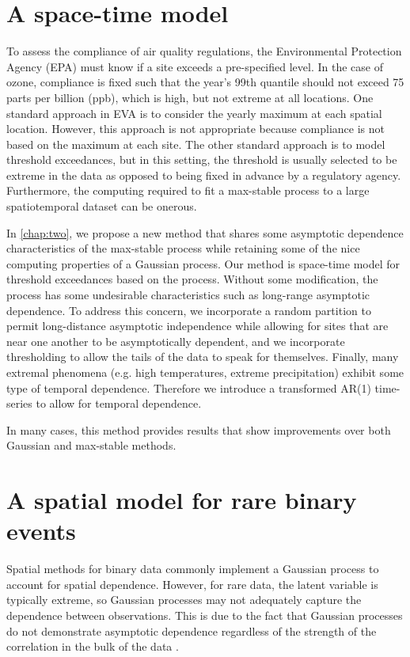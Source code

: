 \section{A space-time \skewt{} model}

To assess the compliance of air quality regulations, the Environmental Protection Agency (EPA) must know if a site exceeds a pre-specified level.
In the case of ozone, compliance is fixed such that the year's 99th quantile should not exceed 75 parts per billion (ppb), which is high, but not extreme at all locations.
One standard approach in EVA is to consider the yearly maximum at each spatial location.
However, this approach is not appropriate because compliance is not based on the maximum at each site.
The other standard approach is to model threshold exceedances, but in this setting, the threshold is usually selected to be extreme in the data as opposed to being fixed in advance by a regulatory agency.
Furthermore, the computing required to fit a max-stable process to a large spatiotemporal dataset can be onerous.

In \cref{chap:two}, we propose a new method that shares some asymptotic dependence characteristics of the max-stable process while retaining some of the nice computing properties of a Gaussian process.
Our method is space-time model for threshold exceedances based on the \skewt{} process.
Without some modification, the \skewt{} process has some undesirable characteristics such as long-range asymptotic dependence.
To address this concern, we incorporate a random partition to permit long-distance asymptotic independence while allowing for sites that are near one another to be asymptotically dependent, and we incorporate thresholding to allow the tails of the data to speak for themselves.
Finally, many extremal phenomena (e.g. high temperatures, extreme precipitation) exhibit some type of temporal dependence.
Therefore we introduce a transformed AR(1) time-series to allow for temporal dependence.

In many cases, this method provides results that show improvements over both Gaussian and max-stable methods.

\section{A spatial model for rare binary events}

Spatial methods for binary data commonly implement a Gaussian process to account for spatial dependence.
However, for rare data, the latent variable is typically extreme, so Gaussian processes may not adequately capture the dependence between observations.
This is due to the fact that Gaussian processes do not demonstrate asymptotic dependence regardless of the strength of the correlation in the bulk of the data \citep{Sibuya1960}.

